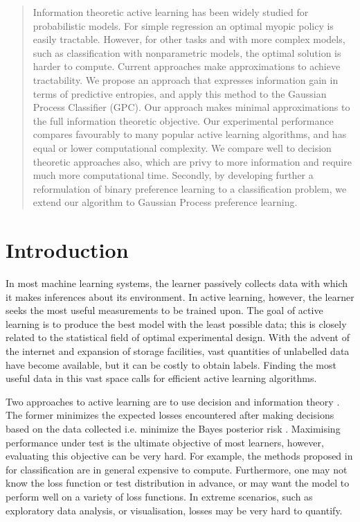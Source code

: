 \documentclass[twoside]{article}
\begin{document}
\begin{abstract}

Information theoretic active learning has been widely studied for probabilistic models. For simple regression an optimal myopic policy is easily tractable. However, for other tasks and with more complex models, such as classification with nonparametric models, the optimal solution is harder to compute. Current approaches make approximations to achieve tractability. We propose an approach that expresses information gain in terms of predictive entropies, and apply this method to the Gaussian Process Classifier (GPC). Our approach makes minimal approximations to the full information theoretic objective. Our experimental performance compares favourably to many popular active learning algorithms, and has equal or lower computational complexity. We compare well to decision theoretic approaches also, which are privy to more information and require much more computational time. Secondly, by developing further a reformulation of binary preference learning to a classification problem, we extend our algorithm to Gaussian Process preference learning.

\end{abstract}

\section{Introduction}
In most machine learning systems, the learner passively collects data with which it makes inferences about its environment. In active learning, however, the learner seeks the most useful measurements to be trained upon. The goal of active learning is to produce the best model with the least possible data; this is closely related to the statistical field of optimal experimental design. With the advent of the internet and expansion of storage facilities, vast quantities of unlabelled data have become available, but it can be costly to obtain labels. Finding the most useful data in this vast space calls for efficient active learning algorithms.

Two approaches to active learning are to use decision and information theory \cite{kapoor2007,lindley1956}. The former minimizes the expected losses encountered after making decisions based on the data collected i.e. minimize the Bayes posterior risk \cite{roy2001}. Maximising performance under test is the ultimate objective of most learners, however, evaluating this objective can be very hard. For example, the methods proposed in \cite{kapoor2007,zhu2003} for classification are in general expensive to compute. Furthermore, one may not know the loss function or test distribution in advance, or may want the model to perform well on a variety of loss functions. In extreme scenarios, such as exploratory data analysis, or visualisation, losses may be very hard to quantify. 
\end{document}
